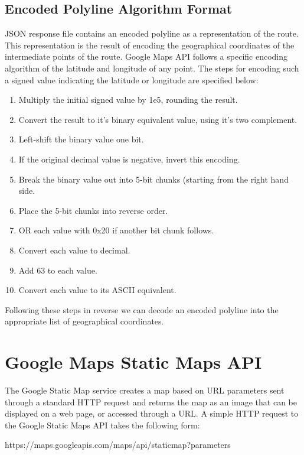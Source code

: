 \subsection{Encoded Polyline Algorithm Format}

JSON response file contains an encoded polyline as a representation of the route. This representation is the result of encoding 
the geographical coordinates of the intermediate points of the route. Google Maps API follows a specific encoding algorithm \cite{17} of the latitude and longitude 
of any point. The steps for encoding such a signed value indicating the latitude or longitude are specified below:

\begin{enumerate}
 \item Multiply the initial signed value by 1e5, rounding the result.
 \item Convert the result to it's binary equivalent value, using it's two complement. 
 \item Left-shift the binary value one bit.
 \item If the original decimal value is negative, invert this encoding.
 \item Break the binary value out into 5-bit chunks (starting from the right hand side.
 \item Place the 5-bit chunks into reverse order.
 \item OR each value with 0x20 if another bit chunk follows.
 \item Convert each value to decimal.
 \item Add 63 to each value.
 \item Convert each value to its ASCII equivalent.
\end{enumerate}

Following these steps in reverse we can decode an encoded polyline into the appropriate list of geographical coordinates. 

\section{Google Maps Static Maps API}

The Google Static Map service \cite{18} creates a map based on URL parameters sent through a standard HTTP request and returns the map as an image 
that can be displayed on a web page, or accessed through a URL. A simple HTTP request to the Google Static Maps API takes the following form:

\begin{center}
 https://maps.googleapis.com/maps/api/staticmap?parameters
\end{center}

